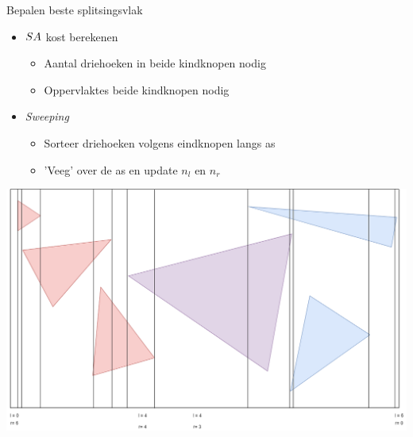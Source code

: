 \documentclass[11pt,t]{beamer}
\begin{document}
\begin{frame}{Bepalen beste splitsingsvlak}
	\begin{itemize}
		\item $SA$ kost berekenen
			\begin{itemize}
				\item Aantal driehoeken in beide kindknopen nodig
				\item Oppervlaktes beide kindknopen nodig
			\end{itemize}
		\pause
		\item \textit{Sweeping}
			\begin{itemize}
				\item Sorteer driehoeken volgens eindknopen langs as
				\item 'Veeg' over de as en update $n_l$ en $n_r$
			\end{itemize}
	\end{itemize}
	\vspace{5pt}
	\hspace{10pt}
	\includegraphics[height=0.45\paperheight]{../img/sweep}
\end{frame}
\end{document}
